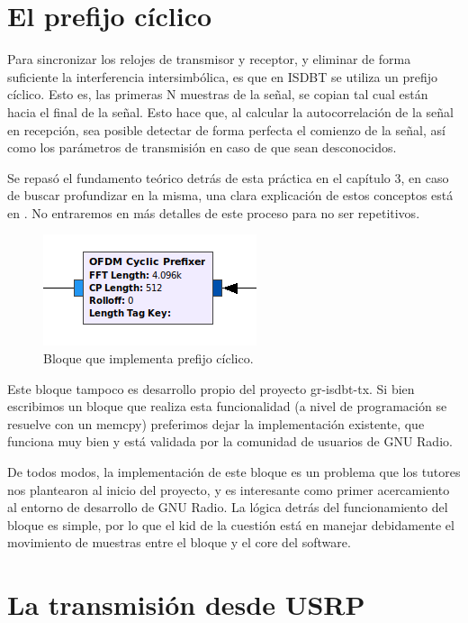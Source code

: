 \section{El prefijo cíclico}

Para sincronizar los relojes de transmisor y receptor, y eliminar de forma suficiente la interferencia intersimbólica, es que en ISDBT se utiliza un prefijo cíclico. Esto es, las primeras N muestras de la señal, se copian tal cual están hacia el final de la señal. Esto hace que, al calcular la autocorrelación de la señal en recepción, sea posible detectar de forma perfecta el comienzo de la señal, así como los parámetros de transmisión en caso de que sean desconocidos. 

Se repasó el fundamento teórico detrás de esta práctica en el capítulo 3, en caso de buscar profundizar en la misma, una clara explicación de estos conceptos está en \cite{gr-isdbt}. No entraremos en más detalles de este proceso para no ser repetitivos.

\begin{figure}[!h]
	\centering
	\includegraphics[scale=0.5]{figuras/cap05/cp}
	\caption{\label{f:cp} Bloque que implementa prefijo cíclico.}
\end{figure}

Este bloque tampoco es desarrollo propio del proyecto gr-isdbt-tx. Si bien escribimos un bloque que realiza esta funcionalidad (a nivel de programación se resuelve con un memcpy) preferimos dejar la implementación existente, que funciona muy bien y está validada por la comunidad de usuarios de GNU Radio.

De todos modos, la implementación de este bloque es un problema que los tutores nos plantearon al inicio del proyecto, y es interesante como primer acercamiento al entorno de desarrollo de GNU Radio. La lógica detrás del funcionamiento del bloque es simple, por lo que el kid de la cuestión está en manejar debidamente el movimiento de muestras entre el bloque y el core del software.

\section{La transmisión desde USRP}


